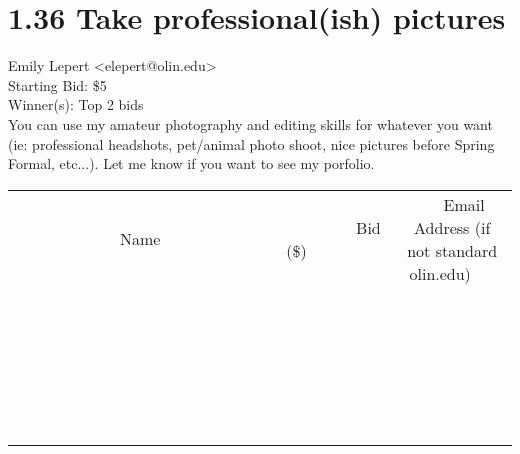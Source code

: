 \documentclass[11pt]{article}
\begin{document}
					\section*{1.36 Take professional(ish) pictures}
					Emily Lepert <elepert@olin.edu> \\
					Starting Bid: \$5 \\
					Winner(s): Top 2 bids \\
					You can use my amateur photography and editing skills for whatever you want (ie: professional headshots, pet/animal photo shoot, nice pictures before Spring Formal, etc...). Let me know if you want to see my porfolio. \\
					[6ex]
					\begin{tabular}{c c c}
						~~~~~~~~~~~~~Name~~~~~~~~~~~~~ & ~~~~~~~~~Bid (\$)~~~~~~~~~ & ~~~Email Address (if not standard olin.edu)~~~ \\
				
 & & \\
\hline
 & & \\
\hline
 & & \\
\hline
 & & \\
\hline
 & & \\
\hline
 & & \\
\hline
 & & \\
\hline
 & & \\
\hline
 & & \\
\hline
 & & \\
\hline
 & & \\
\hline
 & & \\
\hline
 & & \\
\hline
 & & \\
\hline
 & & \\
\hline
 & & \\
\hline
 & & \\
\hline
 & & \\
\hline
 & & \\
\hline
 & & \\
\hline
 & & \\
\hline
 & & \\
\hline
 & & \\
\hline
 & & \\
\hline
 & & \\
\hline
 & & \\
\hline
					\end{tabular}
					\clearpage
				
\end{document}
